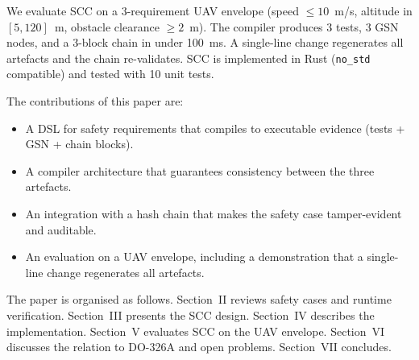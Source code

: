 We evaluate SCC on a 3-requirement UAV envelope (speed $\leq 10$~m/s,
altitude in $[5, 120]$~m, obstacle clearance $\geq 2$~m). The
compiler produces 3 tests, 3 GSN nodes, and a 3-block chain in
under 100~ms. A single-line change regenerates all artefacts and
the chain re-validates. SCC is implemented in Rust (\texttt{no\_std}
compatible) and tested with 10 unit tests.

The contributions of this paper are:

\begin{itemize}
    \item A DSL for safety requirements that compiles to executable
          evidence (tests + GSN + chain blocks).
    \item A compiler architecture that guarantees consistency between
          the three artefacts.
    \item An integration with a hash chain that makes the safety case
          tamper-evident and auditable.
    \item An evaluation on a UAV envelope, including a demonstration
          that a single-line change regenerates all artefacts.
\end{itemize}

The paper is organised as follows. Section~II reviews safety cases
and runtime verification. Section~III presents the SCC design.
Section~IV describes the implementation. Section~V evaluates SCC
on the UAV envelope. Section~VI discusses the relation to DO-326A
and open problems. Section~VII concludes.

